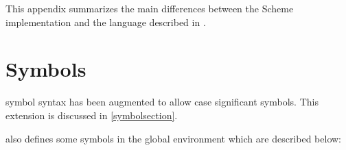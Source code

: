 %
%
%

\newcommand{\schglob}[1]{*#1*}

This appendix summarizes the main differences between the {\stk} Scheme
implementation and the language described in {\rrrr}.

\section{Symbols}

{\stk} symbol syntax has been augmented to allow case significant symbols. 
This extension is discussed in \ref{symbolsection}.

\smallskip {\stk} also defines some symbols in the global environment
which are described below:

